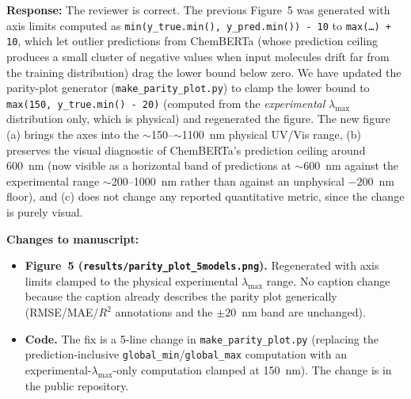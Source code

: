 \documentclass[11pt]{article}
\newcommand{\response}[1]{\noindent\textbf{Response:} #1\par\medskip}
\newenvironment{changes}{%
  \noindent\textbf{Changes to manuscript:}
  \begin{itemize}[leftmargin=2em,itemsep=2pt]}{%
  \end{itemize}\medskip}
\begin{document}
\response{The reviewer is correct. The previous Figure~5 was generated with axis limits computed as \texttt{min(y\_true.min(), y\_pred.min()) - 10} to \texttt{max(\ldots) + 10}, which let outlier predictions from ChemBERTa (whose prediction ceiling produces a small cluster of negative values when input molecules drift far from the training distribution) drag the lower bound below zero. We have updated the parity-plot generator (\texttt{make\_parity\_plot.py}) to clamp the lower bound to \texttt{max(150, y\_true.min() - 20)} (computed from the \emph{experimental} $\lambda_{\max}$ distribution only, which is physical) and regenerated the figure. The new figure (a) brings the axes into the $\sim$150--$\sim$1100~nm physical UV/Vis range, (b) preserves the visual diagnostic of ChemBERTa's prediction ceiling around 600~nm (now visible as a horizontal band of predictions at $\sim$600~nm against the experimental range $\sim$200--1000~nm rather than against an unphysical $-200$~nm floor), and (c) does not change any reported quantitative metric, since the change is purely visual.}

\begin{changes}
  \item \textbf{Figure~5 (\texttt{results/parity\_plot\_5models.png}).} Regenerated with axis limits clamped to the physical experimental $\lambda_{\max}$ range. No caption change because the caption already describes the parity plot generically (RMSE/MAE/$R^2$ annotations and the $\pm 20$~nm band are unchanged).
  \item \textbf{Code.} The fix is a 5-line change in \texttt{make\_parity\_plot.py} (replacing the prediction-inclusive \texttt{global\_min}/\texttt{global\_max} computation with an experimental-$\lambda_{\max}$-only computation clamped at 150~nm). The change is in the public repository.
\end{changes}
\end{document}
